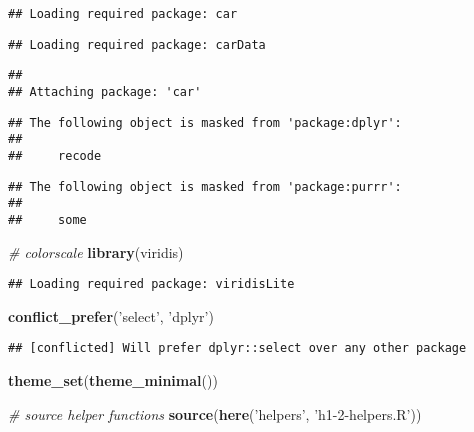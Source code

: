 \documentclass[12pt,]{article}
\newenvironment{Shaded}{\begin{snugshade}}{\end{snugshade}}
\newcommand{\CommentTok}[1]{\textcolor[rgb]{0.56,0.35,0.01}{\textit{#1}}}
\newcommand{\KeywordTok}[1]{\textcolor[rgb]{0.13,0.29,0.53}{\textbf{#1}}}
\newcommand{\NormalTok}[1]{#1}
\newcommand{\StringTok}[1]{\textcolor[rgb]{0.31,0.60,0.02}{#1}}
\begin{document}
\begin{verbatim}
## Loading required package: car
\end{verbatim}

\begin{verbatim}
## Loading required package: carData
\end{verbatim}

\begin{verbatim}
## 
## Attaching package: 'car'
\end{verbatim}

\begin{verbatim}
## The following object is masked from 'package:dplyr':
## 
##     recode
\end{verbatim}

\begin{verbatim}
## The following object is masked from 'package:purrr':
## 
##     some
\end{verbatim}

\begin{Shaded}
\begin{Highlighting}[]
\CommentTok{# colorscale}
\KeywordTok{library}\NormalTok{(viridis)}
\end{Highlighting}
\end{Shaded}

\begin{verbatim}
## Loading required package: viridisLite
\end{verbatim}

\begin{Shaded}
\begin{Highlighting}[]
\KeywordTok{conflict_prefer}\NormalTok{(}\StringTok{'select'}\NormalTok{, }\StringTok{'dplyr'}\NormalTok{)}
\end{Highlighting}
\end{Shaded}

\begin{verbatim}
## [conflicted] Will prefer dplyr::select over any other package
\end{verbatim}

\begin{Shaded}
\begin{Highlighting}[]
\KeywordTok{theme_set}\NormalTok{(}\KeywordTok{theme_minimal}\NormalTok{())}

\CommentTok{# source helper functions}
\KeywordTok{source}\NormalTok{(}\KeywordTok{here}\NormalTok{(}\StringTok{'helpers'}\NormalTok{, }\StringTok{'h1-2-helpers.R'}\NormalTok{))}
\end{Highlighting}
\end{Shaded}
\end{document}

